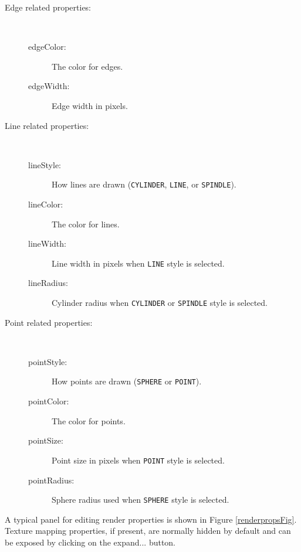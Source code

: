 \documentclass{article}
\begin{document}
\begin{description}
\item[Edge related properties:]
\hfil \\
\begin{description}
\item[edgeColor:]
The color for edges.
\item[edgeWidth:]
Edge width in pixels.
\end{description}

\item[Line related properties:]
\hfil \\
\begin{description}
\item[lineStyle:] 
How lines are drawn ({\tt CYLINDER}, {\tt LINE}, or {\tt SPINDLE}).
\item[lineColor:]
The color for lines.
\item[lineWidth:]
Line width in pixels when {\tt LINE} style is selected.
\item[lineRadius:]
Cylinder radius when {\tt CYLINDER} or {\tt SPINDLE} style is selected.
\end{description}

\item[Point related properties:]
\hfil \\
\begin{description}
\item[pointStyle:] 
How points are drawn ({\tt SPHERE} or {\tt POINT}).
\item[pointColor:] 
The color for points.
\item[pointSize:] 
Point size in pixels when {\tt POINT} style is selected.
\item[pointRadius:] 	
Sphere radius used when {\tt SPHERE} style is selected.
\end{description}

\end{description}

A typical panel for editing render properties is shown in Figure
\ref{renderpropsFig}. Texture mapping properties, if present, are
normally hidden by default and can be exposed by clicking on the {\sf
expand...} button.
\end{document}
